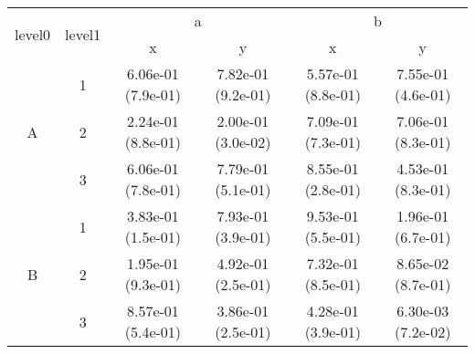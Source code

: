 \begin{tabular}{cccccc}
\toprule
\multirow{2}{*}{level0} & \multirow{2}{*}{level1}&\multicolumn{2}{c}{a}&\multicolumn{2}{c}{b}\tabularnewline
\cmidrule(lr){3-4}
\cmidrule(lr){5-6}
&&x&y&x&y\tabularnewline
\midrule
\multirow{3}{*}{A}&1& 6.06e-01 (7.9e-01)& 7.82e-01 (9.2e-01)& 5.57e-01 (8.8e-01)& 7.55e-01 (4.6e-01)\tabularnewline
&2& 2.24e-01 (8.8e-01)& 2.00e-01 (3.0e-02)& 7.09e-01 (7.3e-01)& 7.06e-01 (8.3e-01)\tabularnewline
&3& 6.06e-01 (7.8e-01)& 7.79e-01 (5.1e-01)& 8.55e-01 (2.8e-01)& 4.53e-01 (8.3e-01)\tabularnewline
\midrule
\multirow{3}{*}{B}&1& 3.83e-01 (1.5e-01)& 7.93e-01 (3.9e-01)& 9.53e-01 (5.5e-01)& 1.96e-01 (6.7e-01)\tabularnewline
&2& 1.95e-01 (9.3e-01)& 4.92e-01 (2.5e-01)& 7.32e-01 (8.5e-01)& 8.65e-02 (8.7e-01)\tabularnewline
&3& 8.57e-01 (5.4e-01)& 3.86e-01 (2.5e-01)& 4.28e-01 (3.9e-01)& 6.30e-03 (7.2e-02)\tabularnewline
\bottomrule
\end{tabular}

